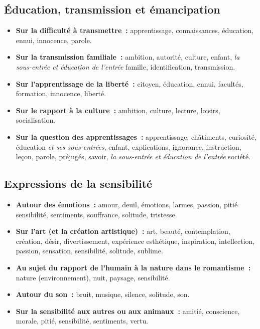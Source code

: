 \subsection{Éducation, transmission et émancipation}
\begin{itemize}\setlength{\itemsep}{6pt}

\item \textbf{Sur la difficulté à transmettre~:} apprentissage, connaissances, éducation, ennui, innocence, parole.

\item \textbf{Sur la transmission familiale~:} ambition, autorité, culture, enfant, \textit{la sous-entrée \emph{et éducation} de l'entrée} famille, identification, transmission.

\item \textbf{Sur l'apprentissage de la liberté~:} citoyen, éducation, ennui, facultés, formation, innocence, liberté.

\item \textbf{Sur le rapport à la culture~:} ambition, culture, lecture, loisirs, socialisation.

\item \textbf{Sur la question des apprentissages~:} apprentissage, châtiments, curiosité, éducation \textit{et ses sous-entrées}, enfant, explications, ignorance, instruction, leçon, parole, préjugés, savoir, \textit{la sous-entrée \emph{et éducation} de l'entrée} société.

\end{itemize}


\subsection{Expressions de la sensibilité}

\begin{itemize}\setlength{\itemsep}{6pt}

\item \textbf{Autour des émotions~:} amour, deuil, émotions, larmes, passion, pitié sensibilité, sentiments, souffrance, solitude, tristesse.

\item \textbf{Sur l'art (et la création artistique)~:} art, beauté, contemplation, création, désir, divertissement, expérience esthétique, inspiration, intellection, passion, sensation, sensibilité, solitude, sublime.

\item \textbf{Au sujet du rapport de l'humain à la nature dans le romantisme~:} nature (environnement), nuit, paysage, sensibilité.

\item \textbf{Autour du son~:} bruit, musique, silence, solitude, son.

\item \textbf{Sur la sensibilité aux autres ou aux animaux~:} amitié, conscience, morale, pitié, sensibilité, sentiments, vertu.

\end{itemize}

